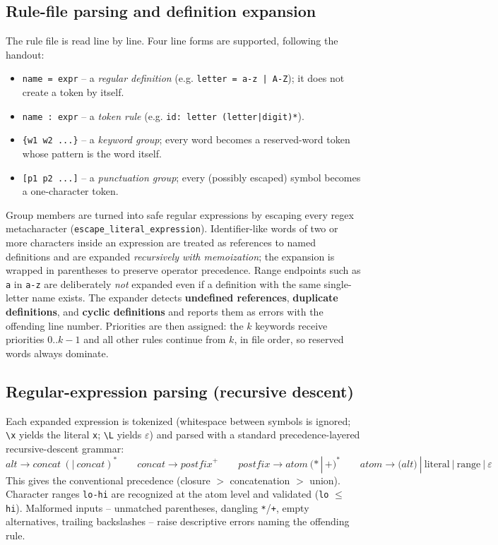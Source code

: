 \documentclass[11pt,a4paper]{article}
\begin{document}
\subsection{Rule-file parsing and definition expansion}
The rule file is read line by line. Four line forms are supported, following the
handout:
\begin{itemize}
    \item \texttt{name = expr} -- a \emph{regular definition} (e.g.
          \texttt{letter = a-z | A-Z}); it does not create a token by itself.
    \item \texttt{name : expr} -- a \emph{token rule} (e.g.
          \texttt{id: letter (letter|digit)*}).
    \item \texttt{\{w1 w2 ...\}} -- a \emph{keyword group}; every word becomes a
          reserved-word token whose pattern is the word itself.
    \item \texttt{[p1 p2 ...]} -- a \emph{punctuation group}; every
          (possibly escaped) symbol becomes a one-character token.
\end{itemize}
Group members are turned into safe regular expressions by escaping every regex
metacharacter (\texttt{escape\_literal\_expression}). Identifier-like words of
two or more characters inside an expression are treated as references to named
definitions and are expanded \emph{recursively with memoization}; the expansion
is wrapped in parentheses to preserve operator precedence. Range endpoints such
as \texttt{a} in \texttt{a-z} are deliberately \emph{not} expanded even if a
definition with the same single-letter name exists. The expander detects
\textbf{undefined references}, \textbf{duplicate definitions}, and
\textbf{cyclic definitions} and reports them as errors with the offending line
number. Priorities are then assigned: the $k$ keywords receive priorities
$0..k-1$ and all other rules continue from $k$, in file order, so reserved words
always dominate.

\subsection{Regular-expression parsing (recursive descent)}
Each expanded expression is tokenized (whitespace between symbols is ignored;
\texttt{\textbackslash x} yields the literal \texttt{x}; \texttt{\textbackslash L}
yields $\varepsilon$) and parsed with a standard precedence-layered
recursive-descent grammar:
\[
\textit{alt} \rightarrow \textit{concat}\ (\texttt{|}\ \textit{concat})^* \qquad
\textit{concat} \rightarrow \textit{postfix}^+ \qquad
\textit{postfix} \rightarrow \textit{atom}\ (\texttt{*}\,|\,\texttt{+})^* \qquad
\textit{atom} \rightarrow \texttt{(}\textit{alt}\texttt{)}\ |\ \text{literal}\ |\ \text{range}\ |\ \varepsilon
\]
This gives the conventional precedence (closure $>$ concatenation $>$ union).
Character ranges \texttt{lo-hi} are recognized at the atom level and validated
(\texttt{lo} $\le$ \texttt{hi}). Malformed inputs -- unmatched parentheses,
dangling \texttt{*}/\texttt{+}, empty alternatives, trailing backslashes --
raise descriptive errors naming the offending rule.
\end{document}
